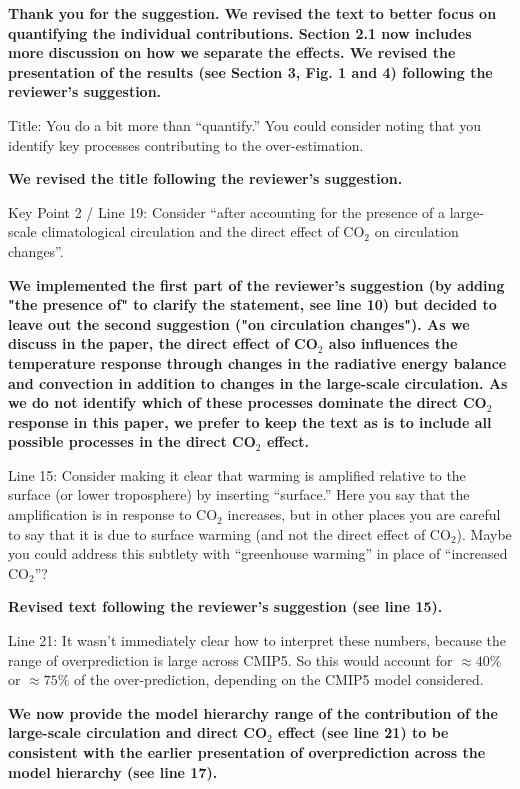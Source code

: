 \documentclass[11pt]{article}
\begin{document}
\textbf{Thank you for the suggestion. We revised the text to better focus on quantifying the individual contributions. Section 2.1 now includes more discussion on how we separate the effects. We revised the presentation of the results (see Section 3, Fig. 1 and 4) following the reviewer's suggestion.}

Title: You do a bit more than ``quantify.'' You could consider noting that you identify key processes contributing to the over-estimation.

\textbf{We revised the title following the reviewer's suggestion.}

Key Point 2 / Line 19: Consider ``after accounting for the presence of a large-scale climatological circulation and the direct effect of CO\(_2\) on circulation changes''.

\textbf{We implemented the first part of the reviewer's suggestion (by adding "the presence of" to clarify the statement, see line 10) but decided to leave out the second suggestion ("on circulation changes"). As we discuss in the paper, the direct effect of CO\(_2\) also influences the temperature response through changes in the radiative energy balance and convection in addition to changes in the large-scale circulation. As we do not identify which of these processes dominate the direct CO\(_2\) response in this paper, we prefer to keep the text as is to include all possible processes in the direct CO\(_2\) effect.}

Line 15: Consider making it clear that warming is amplified relative to the surface (or lower troposphere) by inserting ``surface.'' Here you say that the amplification is in response to CO\(_2\) increases, but in other places you are careful to say that it is due to surface warming (and not the direct effect of CO\(_2\)). Maybe you could address this subtlety with ``greenhouse warming'' in place of ``increased CO\(_2\)''?

\textbf{Revised text following the reviewer's suggestion (see line 15).}

Line 21: It wasn't immediately clear how to interpret these numbers, because the range of overprediction is large across CMIP5. So this would account for \(\approx40\%\) or \(\approx75\%\) of the over-prediction, depending on the CMIP5 model considered.

\textbf{We now provide the model hierarchy range of the contribution of the large-scale circulation and direct CO$_2$ effect (see line 21) to be consistent with the earlier presentation of overprediction across the model hierarchy (see line 17).}
\end{document}
